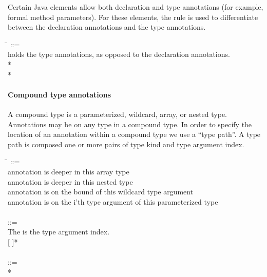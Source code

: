 \documentclass{article}
\begin{document}
\noindent
Certain Java elements allow both declaration and type annotations (for example,
formal method parameters). For these elements, the 
rule is used to differentiate between the declaration annotations and the type
annotations.

\begin{tabbing}
\qquad \= \kill
{} ::= \\
\qquad    \bnfcmt holds the type annotations, as opposed to the declaration annotations. \\
\qquad        {} * \lineend \\
\qquad        {}*
\end{tabbing}


\paragraph{Compound type annotations}

A compound type is a parameterized, wildcard, array, or nested type. Annotations
may be on any type in a compound type. In order to specify the location of an
annotation within a compound type we use a ``type path''. A
type path is composed one or more pairs of type kind and type argument index.

\begin{tabbing}
\qquad \= \kill
{} ::= \\
\qquad    {} \bnfcmt annotation is deeper in this array type \\
\qquad    \bnfor{}  \bnfcmt annotation is deeper in this nested type \\
\qquad    \bnfor{}  \bnfcmt annotation is on the bound of this wildcard type argument \\
\qquad    \bnfor{}  \bnfcmt annotation is on the i'th type argument of this parameterized type \\
\\
 ::= \\
\qquad    \bnfcmt The  is the type argument index. \\
\qquad    {} \bnflit{,}  [ \bnflit{,}  \bnflit{,}  ]* \\
\\
 ::= \\
\qquad    {}  \bnflit{:} * \lineend
\end{tabbing}
\end{document}
